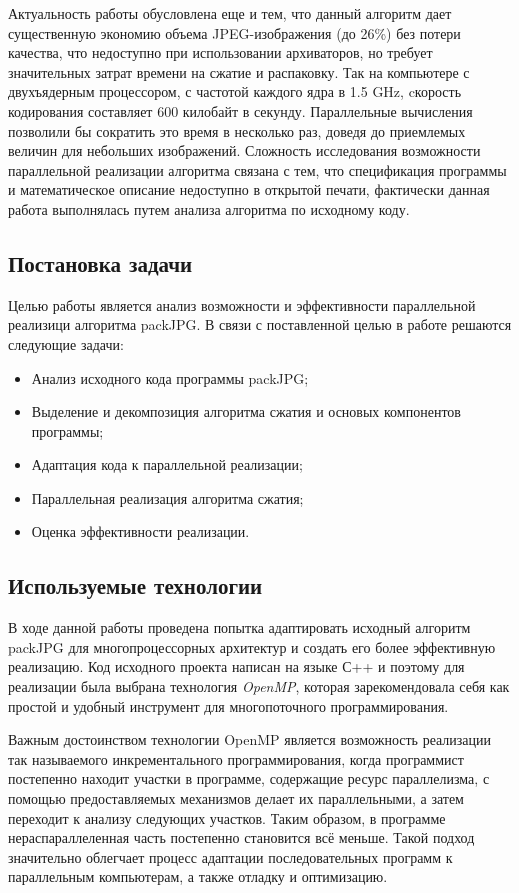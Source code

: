 \documentclass{matmex-diploma-custom}
\begin{document}
Актуальность работы обусловлена еще и тем, что данный алгоритм дает существенную экономию объема JPEG-изображения (до 26\%) без потери качества, что недоступно при использовании архиваторов, но требует значительных затрат времени на сжатие и распаковку. Так на компьютере с двухъядерным процессором, с частотой каждого ядра в 1.5 GHz, cкорость кодирования составляет 600 килобайт в секунду. Параллельные вычисления позволили бы сократить это время в несколько раз, доведя до приемлемых величин для небольших изображений. Сложность исследования возможности параллельной реализации алгоритма связана с тем, что спецификация программы и математическое описание недоступно в открытой печати, фактически данная работа выполнялась путем анализа алгоритма по исходному коду.

\subsection*{Постановка задачи}

Целью работы является анализ возможности и эффективности параллельной реализици алгоритма packJPG.
В связи с поставленной целью в работе решаются следующие задачи:
\begin{itemize}
    \item{Анализ исходного кода программы packJPG;}
    \item{Выделение и декомпозиция алгоритма сжатия и основых компонентов программы;}
    \item{Адаптация кода к параллельной реализации;}
    \item{Параллельная реализация алгоритма сжатия;}
    \item{Оценка эффективности реализации.}
\end{itemize}


\subsection*{Используемые технологии}
В ходе данной работы  проведена попытка адаптировать исходный алгоритм packJPG для многопроцессорных архитектур и создать его более эффективную реализацию. Код исходного проекта написан на языке С++ и поэтому для реализации была выбрана технология \emph{OpenMP}\cite{offical-openmp}, которая зарекомендовала себя как простой и удобный инструмент для многопоточного программирования.


Важным достоинством технологии OpenMP является возможность реализации так называемого инкрементального программирования, когда программист постепенно находит участки в программе, содержащие ресурс параллелизма, с помощью предоставляемых механизмов делает их параллельными, а затем переходит к анализу следующих участков. Таким образом, в программе нераспараллеленная часть постепенно становится всё меньше. Такой подход значительно облегчает процесс адаптации последовательных программ к параллельным компьютерам, а также отладку и оптимизацию.
\end{document}
